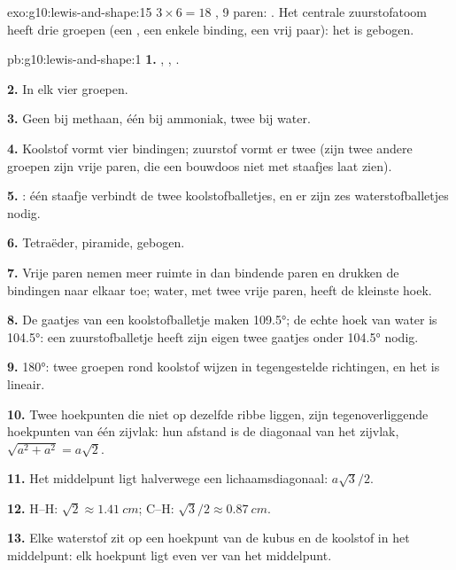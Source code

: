 \begin{solution}{exo:g10:lewis-and-shape:15}
$3 \times 6 = 18$ , 9 paren:
. Het centrale
zuurstofatoom heeft drie groepen (een , een enkele binding,
een vrij paar): het  is gebogen.
\end{solution}

\begin{solution}{pb:g10:lewis-and-shape:1}
\textbf{1.} , ,
.

\textbf{2.} In elk vier groepen.

\textbf{3.} Geen bij methaan, één bij ammoniak, twee bij water.

\textbf{4.} Koolstof vormt vier bindingen; zuurstof vormt er twee (zijn
twee andere groepen zijn vrije paren, die een bouwdoos niet met
staafjes laat zien).

\textbf{5.} : één staafje
verbindt de twee koolstofballetjes, en er zijn zes waterstofballetjes
nodig.

\textbf{6.} Tetraëder, piramide, gebogen.

\textbf{7.} Vrije paren nemen meer ruimte in dan bindende paren en drukken
de bindingen naar elkaar toe; water, met twee vrije paren, heeft de
kleinste hoek.

\textbf{8.} De gaatjes van een koolstofballetje maken \ang{109.5}; de
echte hoek van water is \ang{104.5}: een zuurstofballetje heeft zijn eigen
twee gaatjes onder \ang{104.5} nodig.

\textbf{9.} \ang{180}: twee groepen rond koolstof wijzen in
tegengestelde richtingen, en het  is lineair.

\textbf{10.} Twee hoekpunten die niet op dezelfde ribbe liggen, zijn
tegenoverliggende hoekpunten van één zijvlak: hun afstand is de
diagonaal van het zijvlak, $\sqrt{a^2 + a^2} = a\sqrt{2}$.

\textbf{11.} Het middelpunt ligt halverwege een lichaamsdiagonaal:
$a\sqrt{3}/2$.

\textbf{12.} H--H: $\sqrt{2} \approx \qty{1.41}{cm}$; C--H:
$\sqrt{3}/2 \approx \qty{0.87}{cm}$.

\textbf{13.} Elke waterstof zit op een hoekpunt van de kubus en de
koolstof in het middelpunt: elk hoekpunt ligt even ver van het
middelpunt.


\end{solution}
